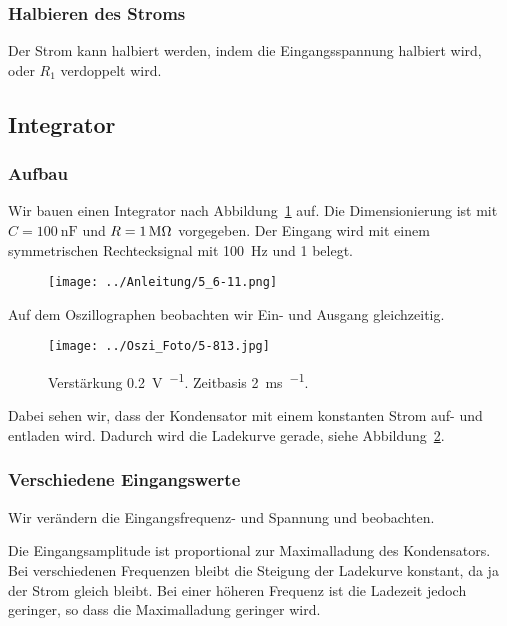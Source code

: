 \subsubsection{Halbieren des Stroms}

Der Strom kann halbiert werden, indem die Eingangsspannung halbiert wird, oder
$R_1$ verdoppelt wird.

\FloatBarrier
\subsection{Integrator}

\subsubsection{Aufbau}

Wir bauen einen Integrator nach Abbildung~\ref{fig:5_6-11} auf. Die
Dimensionierung ist mit $C = \SI{100}{\nano\farad}$ und $R = \SI1{\mega\ohm}$
vorgegeben. Der Eingang wird mit einem symmetrischen Rechtecksignal mit
\SI{100}{\hertz} und \SI{1}{\voltss} belegt.

\begin{figure}[htbp]
	\centering
	\texttt{[image: ../Anleitung/5\_6-11.png]}
	\caption{%
		\cite[Abbildung~5/6.11]{physik313-Anleitung}
	}
	\label{fig:5_6-11}
\end{figure}

Auf dem Oszillographen beobachten wir Ein- und Ausgang gleichzeitig.

\begin{figure}[htbp]
	\centering
	\texttt{[image: ../Oszi\_Foto/5-813.jpg]}
	\caption{%
		Verstärkung \SI{.2}{\volt\per\division}. Zeitbasis
		\SI{2}{\milli\second\per\division}.
	}
	\label{fig:813}
\end{figure}

Dabei sehen wir, dass der Kondensator mit einem konstanten Strom auf- und
entladen wird. Dadurch wird die Ladekurve gerade, siehe
Abbildung~\ref{fig:813}.

\subsubsection{Verschiedene Eingangswerte}

Wir verändern die Eingangsfrequenz- und Spannung und beobachten.

Die Eingangsamplitude ist proportional zur Maximalladung des Kondensators. Bei
verschiedenen Frequenzen bleibt die Steigung der Ladekurve konstant, da ja der
Strom gleich bleibt. Bei einer höheren Frequenz ist die Ladezeit jedoch
geringer, so dass die Maximalladung geringer wird.

